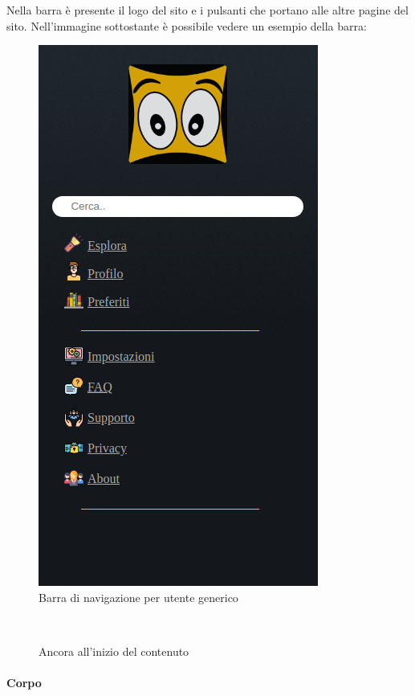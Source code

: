 Nella barra è presente il logo del sito e i pulsanti che portano alle altre pagine del sito. Nell'immagine sottostante è possibile vedere un esempio della barra: 
\begin{figure}[h!]  				%
	\centerline{\includegraphics[scale=0.45]{img/nav_bar.png}}
	\caption{Barra di navigazione per utente generico}
	\label{fig:navbarGU}
\end{figure}
~\\

\newpage
\begin{figure}[h!]
	\caption{Ancora all'inizio del contenuto}
\end{figure}
\paragraph{Corpo}
~\\

